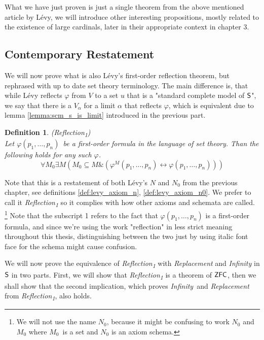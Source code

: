 \documentclass[12pt,a4paper]{article}
\newtheorem{definition}[theorem]{Definition}
\renewcommand{\iff}{\leftrightarrow}
\newcommand{\et}{\mathrel{\&}}
\begin{document}
What we have just proven is just a single theorem from the above mentioned article by Lévy, we will introduce other interesting propositions, mostly related to the existence of large cardinals, later in their appropriate context in chapter 3.


\subsection{Contemporary Restatement}
We will now prove what is also Lévy's first-order reflection theorem, but rephrased with up to date set theory terminology. The main difference is, that while Lévy reflects $\varphi$ from $V$ to a set $u$ that is a "standard complete model of $\sf{S}$", we say that there is a $V_\alpha$ for a limit $\alpha$ that reflects $\varphi$, which is equivalent due to lemma \ref{lemma:scm_s_is_limit} introduced in the previous part.

\begin{definition}{(Reflection\textsubscript{1})}\label{def:reflection_1}\\
Let $\varphi(p_1, \ldots, p_n)$ be a first-order formula in the language of set theory. Than the following holds for any such $\varphi$.
\begin{equation}
\forall M_0 \exists M (M_0 \subseteq M \et (\varphi^M(p_1, \ldots, p_n) \iff \varphi(p_1, \ldots, p_n)))
\end{equation}
\end{definition}
Note that this is a restatement of both Lévy's $N$ and $N_0$ from the previous chapter, see definitions \ref{def:levy_axiom_n}, \ref{def:levy_axiom_n0}. We prefer to call it \emph{Reflection\textsubscript{1}} so it complies with how other axioms and schemata are called. \footnote{We will not use the name $N_0$, because it might be confusing to work $N_0$ and $M_0$ where $M_0$ is a set and $N_0$ is an axiom schema.} Note that the subscript 1 refers to the fact that $\varphi(p_1, \ldots, p_n)$ is a first-order formula, and since we're using the work "reflection" in less strict meaning throughout this thesis, distinguishing between the two just by using italic font face for the schema might cause confusion.

We will now prove the equivalence of \emph{Reflection\textsubscript{1}} with \emph{Replacement} and \emph{Infinity} in $\sf{S}$ in two parts. First, we will show that \emph{Reflection\textsubscript{1}} is a theorem of $\sf{ZFC}$, then we shall show that the second implication, which proves \emph{Infinity} and \emph{Replacement} from \emph{Reflection\textsubscript{1}}, also holds.
\end{document}
